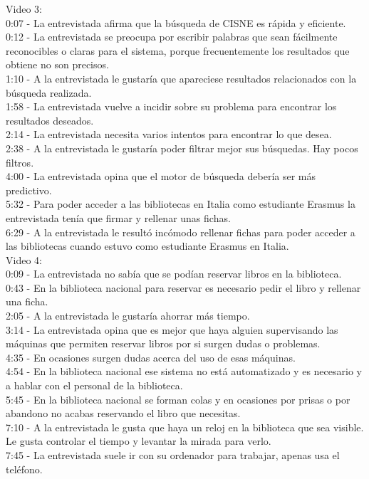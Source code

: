 \documentclass[12pt]{article}
\begin{document}
Video 3: \\ 
0:07 - La entrevistada afirma que la búsqueda de CISNE es rápida y eficiente. \\
0:12 - La entrevistada se preocupa por escribir palabras que sean fácilmente reconocibles o claras para el sistema, porque frecuentemente los resultados que obtiene no son precisos. \\
1:10 - A la entrevistada le gustaría que apareciese resultados relacionados con la búsqueda realizada. \\
1:58 - La entrevistada vuelve a incidir sobre su problema para encontrar los resultados deseados. \\
2:14 - La entrevistada necesita varios intentos para encontrar lo que desea. \\
2:38 - A la entrevistada le gustaría poder filtrar mejor sus búsquedas. Hay pocos filtros. \\
4:00 - La entrevistada opina que el motor de búsqueda debería ser más predictivo. \\
5:32 - Para poder acceder a las bibliotecas en Italia como estudiante Erasmus la entrevistada tenía que firmar y rellenar unas fichas.\\
6:29 - A la entrevistada le resultó incómodo rellenar fichas para poder acceder a las bibliotecas cuando estuvo como estudiante Erasmus en Italia.\\

Video 4: \\
0:09 - La entrevistada no sabía que se podían reservar libros en la biblioteca. \\
0:43 - En la biblioteca nacional para reservar es necesario pedir el libro y rellenar una ficha. \\
2:05 - A la entrevistada le gustaría ahorrar más tiempo. \\
3:14 - La entrevistada opina que es mejor que haya alguien supervisando las máquinas que permiten reservar libros por si surgen dudas o problemas. \\
4:35 - En ocasiones surgen dudas acerca del uso de esas máquinas. \\
4:54 - En la biblioteca nacional ese sistema no está automatizado y es necesario y a hablar con el personal de la biblioteca. \\
5:45 - En la biblioteca nacional se forman colas y en ocasiones por prisas o por abandono no acabas reservando el libro que necesitas. \\
7:10 - A la entrevistada le gusta que haya un reloj en la biblioteca que sea visible. Le gusta controlar el tiempo  y levantar la mirada para verlo. \\
7:45 - La entrevistada suele ir con su ordenador para trabajar, apenas usa el teléfono. \\
\end{document}
